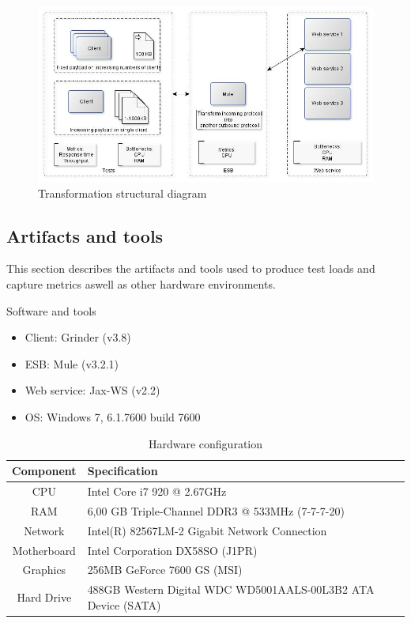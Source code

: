 \begin{figure}[H]
	\centerline{\includegraphics[scale=0.43]{img/transformation}}
	\caption{Transformation structural diagram}
	\label{fig:transform-diagram}
\end{figure}

\newpage
\subsection{Artifacts and tools}
This section describes the artifacts and tools used to produce test loads and capture metrics aswell as other hardware environments.

\begin{table}[H]
	\caption{Software and tools}
	\label{table:sw-spec}
	\begin{itemize}
		\item Client: Grinder (v3.8) \cite{whatisgrinder}
		\item ESB: Mule (v3.2.1) \cite{whatismule}
		\item Web service: Jax-WS (v2.2) \cite{whatisjaxws}
		\item OS: Windows 7, 6.1.7600 build 7600
	\end{itemize}
\end{table}

\begin{table}[H]
	\caption{Hardware configuration}
	\label{table:hw-spec}
	\begin{tabular}{c l}
		Component & Specification \\ 
		\hline
		CPU & Intel Core i7 920 @ 2.67GHz  \\
		RAM &  6,00 GB Triple-Channel DDR3 @ 533MHz (7-7-7-20) \\
		Network &  Intel(R) 82567LM-2 Gigabit Network Connection \\
		Motherboard &  Intel Corporation DX58SO (J1PR) \\
		Graphics &  256MB GeForce 7600 GS (MSI) \\
		Hard Drive &  488GB Western Digital WDC WD5001AALS-00L3B2 ATA Device (SATA) \\
		\hline
	\end{tabular} 
\end{table}

